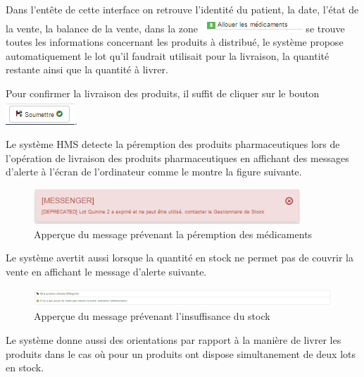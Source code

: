 \documentclass[12pt,a4paper]{report}
\begin{document}
Dans l'entête de cette interface on retrouve l'identité du patient, la date, l'état de la vente, la balance de la vente, dans la zone \includegraphics[scale=0.7]{pic/AllocateDrug.png} se trouve toutes les informations concernant les produits à distribué, le système propose automatiquement le lot qu'il faudrait utilisait pour la livraison, la quantité restante ainsi que la quantité à livrer.

Pour confirmer la livraison des produits, il suffit de cliquer sur le bouton \includegraphics[scale=0.7]{pic/SoumettreDistribution.png}.

Le système HMS detecte la péremption des produits pharmaceutiques lors de l'opération de livraison des produits pharmaceutiques en affichant des messages d'alerte à l'écran de l'ordinateur comme le montre la figure suivante.

\begin{figure}[h]
\begin{center}
\includegraphics[width=10cm]{pic/expirationDrug.png}
\end{center}
\caption{Apperçue du message prévenant la péremption des médicaments}
\label{Apperçue du message prévenant la péremption des médicaments}
\end{figure}

Le système avertit aussi lorsque la quantité en stock ne permet pas de couvrir la vente en affichant le message d'alerte suivante.

\begin{figure}[h]
\begin{center}
\includegraphics[width=14cm]{pic/InsuffStock.png}
\end{center}
\caption{Apperçue du message prévenant l'insuffisance du stock}
\label{Apperçue du message prévenant l'insuffisance du stock}
\end{figure}

Le système donne aussi des orientations par rapport à la manière de livrer les produits dans le cas où pour un produits ont dispose simultanement de deux lots en stock.  
\end{document}
